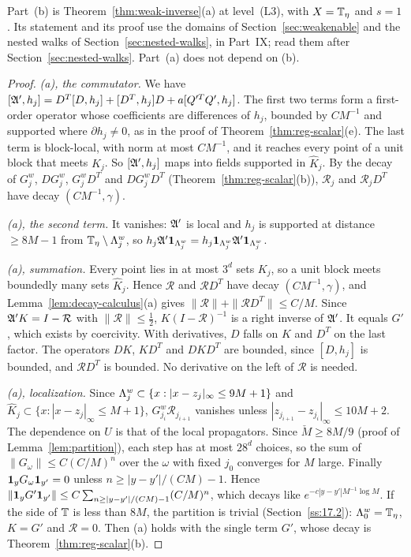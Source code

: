 Part~(b) is Theorem~\ref{thm:weak-inverse}(a) at level~(L3), with $X=\mathbb T_\eta$ and $s=1$. Its statement and its proof use the domains of Section~\ref{sec:weakenable} and the nested walks of Section~\ref{sec:nested-walks}, in Part~IX; read them after Section~\ref{sec:nested-walks}. Part~(a) does not depend on (b).

\begin{proof}
\emph{(a), the commutator.} We have $[\mathfrak A',h_j]=D^T[D,h_j]+[D^T,h_j]D+a[Q'^TQ',h_j]$. The first two terms form a first-order operator whose coefficients are differences of $h_j$, bounded by $CM^{-1}$ and supported where $\partial h_j\ne0$, as in the proof of Theorem~\ref{thm:reg-scalar}(e). The last term is block-local, with norm at most $CM^{-1}$, and it reaches every point of a unit block that meets $K_j$. So $[\mathfrak A',h_j]$ maps into fields supported in $\hat K_j$. By the decay of $G^w_j$, $DG^w_j$, $G^w_jD^T$ and $DG^w_jD^T$ (Theorem~\ref{thm:reg-scalar}(b)), $\mathcal R_j$ and $\mathcal R_jD^T$ have decay $(CM^{-1},\gamma)$.

\emph{(a), the second term.} It vanishes: $\mathfrak A'$ is local and $h_j$ is supported at distance $\ge8M-1$ from $\mathbb T_\eta\setminus\Lambda^w_j$, so $h_j\mathfrak A'\mathbf 1_{\Lambda^w_j}=h_j\mathbf 1_{\Lambda^w_j}\mathfrak A'\mathbf 1_{\Lambda^w_j}$.

\emph{(a), summation.} Every point lies in at most $3^d$ sets $K_j$, so a unit block meets boundedly many sets $\hat K_j$. Hence $\mathcal R$ and $\mathcal RD^T$ have decay $(CM^{-1},\gamma)$, and Lemma~\ref{lem:decay-calculus}(a) gives $\|\mathcal R\|+\|\mathcal RD^T\|\le C/M$. Since $\mathfrak A'K=I-\mathcal R$ with $\|\mathcal R\|\le\frac12$, $K(I-\mathcal R)^{-1}$ is a right inverse of $\mathfrak A'$. It equals $G'$, which exists by coercivity. With derivatives, $D$ falls on $K$ and $D^T$ on the last factor. The operators $DK$, $KD^T$ and $DKD^T$ are bounded, since $[D,h_j]$ is bounded, and $\mathcal RD^T$ is bounded. No derivative on the left of $\mathcal R$ is needed.

\emph{(a), localization.} Since $\Lambda^w_j\subset\{x:|x-z_j|_\infty\le9M+1\}$ and $\hat K_j\subset\{x:|x-z_j|_\infty\le M+1\}$, $G^w_{j_i}\mathcal R_{j_{i+1}}$ vanishes unless $|z_{j_{i+1}}-z_{j_i}|_\infty\le10M+2$. The dependence on $U$ is that of the local propagators. Since $\check M\ge8M/9$ (proof of Lemma~\ref{lem:partition}), each step has at most $28^d$ choices, so the sum of $\|G_\omega\|\le C(C/M)^n$ over the $\omega$ with fixed $j_0$ converges for $M$ large. Finally $\mathbf 1_yG_\omega\mathbf 1_{y'}=0$ unless $n\ge|y-y'|/(CM)-1$. Hence $\|\mathbf 1_yG'\mathbf 1_{y'}\|\le C\sum_{n\ge|y-y'|/(CM)-1}(C/M)^n$, which decays like $e^{-c|y-y'|M^{-1}\log M}$. If the side of $\mathbb T$ is less than $8M$, the partition is trivial (Section~\ref{ss:17.2}): $\Lambda^w_0=\mathbb T_\eta$, $K=G'$ and $\mathcal R=0$. Then (a) holds with the single term $G'$, whose decay is Theorem~\ref{thm:reg-scalar}(b).


\end{proof}
